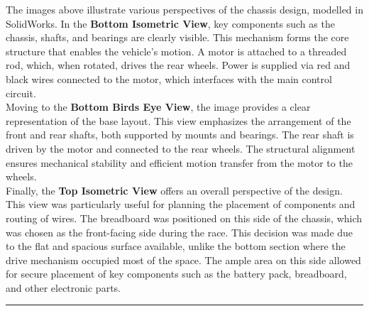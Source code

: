 \documentclass{article}
\begin{document}
The images above illustrate various perspectives of the chassis design, modelled in SolidWorks. In the \textbf{Bottom Isometric View}, key components such as the chassis, shafts, and bearings are clearly visible. This mechanism forms the core structure that enables the vehicle's motion. A motor is attached to a threaded rod, which, when rotated, drives the rear wheels. Power is supplied via red and black wires connected to the motor, which interfaces with the main control circuit.\\[8pt]
Moving to the \textbf{Bottom Birds Eye View}, the image provides a clear representation of the base layout. This view emphasizes the arrangement of the front and rear shafts, both supported by mounts and bearings. The rear shaft is driven by the motor and connected to the rear wheels. The structural alignment ensures mechanical stability and efficient motion transfer from the motor to the wheels.\\[8pt]
Finally, the \textbf{Top Isometric View} offers an overall perspective of the design. This view was particularly useful for planning the placement of components and routing of wires. The breadboard was positioned on this side of the chassis, which was chosen as the front-facing side during the race. This decision was made due to the flat and spacious surface available, unlike the bottom section where the drive mechanism occupied most of the space. The ample area on this side allowed for secure placement of key components such as the battery pack, breadboard, and other electronic parts.
\vspace{1em}\hrule\vspace{0.5em}\noindent
\end{document}
